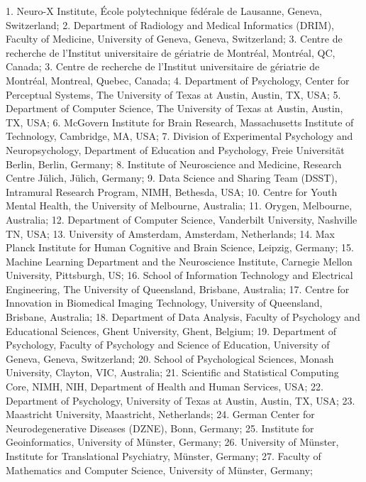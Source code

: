 \documentclass[10pt,a4paper,twocolumns]{proc}
\newcommand{\affiliations}[1]{{\scriptsize #1} \\}
\begin{document}
\affiliations{1. Neuro-X Institute, École polytechnique fédérale de Lausanne, Geneva, Switzerland; %
2. Department of Radiology and Medical Informatics (DRIM), Faculty of Medicine, University of Geneva, Geneva, Switzerland; %
3. Centre de recherche de l'Institut universitaire de gériatrie de Montréal, Montréal, QC, Canada; %
3. Centre de recherche de l'Institut universitaire de gériatrie de Montréal, Montreal, Quebec, Canada; %
4. Department of Psychology, Center for Perceptual Systems, The University of Texas at Austin, Austin, TX, USA; %
5. Department of Computer Science, The University of Texas at Austin, Austin, TX, USA; %
6. McGovern Institute for Brain Research, Massachusetts Institute of Technology, Cambridge, MA, USA; %
7. Division of Experimental Psychology and Neuropsychology, Department of Education and Psychology, Freie Universität Berlin, Berlin, Germany; %
8. Institute of Neuroscience and Medicine, Research Centre Jülich, Jülich, Germany; %
9. Data Science and Sharing Team (DSST), Intramural Research Program, NIMH, Bethesda, USA; %
10. Centre for Youth Mental Health, the University of Melbourne, Australia; %
11. Orygen, Melbourne, Australia; %
12. Department of Computer Science, Vanderbilt University, Nashville TN, USA; %
13. University of Amsterdam, Amsterdam, Netherlands; %
14. Max Planck Institute for Human Cognitive and Brain Science, Leipzig, Germany; %
15. Machine Learning Department and the Neuroscience Institute, Carnegie Mellon University, Pittsburgh, US; %
16. School of Information Technology and Electrical Engineering, The University of Queensland, Brisbane, Australia; %
17. Centre for Innovation in Biomedical Imaging Technology, University of Queensland, Brisbane, Australia; %
18. Department of Data Analysis, Faculty of Psychology and Educational Sciences, Ghent University, Ghent, Belgium; %
19. Department of Psychology, Faculty of Psychology and Science of Education, University of Geneva, Geneva, Switzerland; %
20. School of Psychological Sciences, Monash University, Clayton, VIC, Australia; %
21. Scientific and Statistical Computing Core, NIMH, NIH, Department of Health and Human Services, USA; %
22. Department of Psychology, University of Texas at Austin, Austin, TX, USA; %
23. Maastricht University, Maastricht, Netherlands; %
24. German Center for Neurodegenerative Diseases (DZNE), Bonn, Germany; %
25. Institute for Geoinformatics, University of Münster, Germany; %
26. University of Münster, Institute for Translational Psychiatry, Münster, Germany; %
27. Faculty of Mathematics and Computer Science, University of Münster, Germany; %
}
\end{document}
